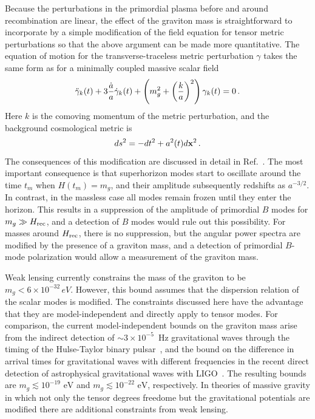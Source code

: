 Because the perturbations in the primordial plasma before and around recombination are linear, the effect of the graviton mass is straightforward to incorporate by a simple modification of the field equation for tensor metric perturbations so that the above argument can be made more quantitative. The equation of motion for the transverse-traceless metric perturbation $\gamma$ takes the same form as for a minimally coupled massive scalar field
\begin{equation}
\label{massive}
\ddot{\gamma}_k(t)+3{\dot a\over a} \dot{\gamma}_k(t)+\left(m_g^2+\left(\frac{k}{a}\right)^2\right) \gamma_k(t)=0\,.
\end{equation}
Here $k$ is the comoving momentum of the metric perturbation, and the background cosmological metric is
\begin{equation}
ds^2= -dt^2+a^2(t)d{\bf x}^2\,.
\end{equation}
The consequences of this modification are discussed in detail in Ref.~\cite{Dubovsky:2009xk}. The most important consequence is that superhorizon modes start to oscillate around the time $t_m$ when $H(t_m)=m_g$, and their amplitude subsequently redshifts as $a^{-3/2}$. In contrast, in the massless case all modes remain frozen until they enter the horizon. This results in a suppression of the amplitude of primordial $B$ modes for $m_g\gg H_{\rm rec}$, and a detection of $B$ modes would rule out this possibility. For masses around $H_{\rm rec}$, there is no suppression, but the angular power spectra are modified by the presence of a graviton mass, and a detection of primordial $B$-mode polarization would allow a measurement of the graviton mass. 
 
Weak lensing currently constrains the mass of the graviton to be $m_g<6\times 10^{-32}\,eV$. However, this bound assumes that the dispersion relation of the scalar modes is modified. The constraints discussed here have the advantage that they are model-independent and directly apply to tensor modes. For comparison, the current model-independent bounds on the graviton mass arise from the indirect detection of $\sim 3\times 10^{-5}$~Hz gravitational waves through the timing of the Hulse-Taylor binary pulsar~\cite{Finn:2001qi}, and the bound on the difference in arrival times for gravitational waves with different frequencies in the recent direct detection of astrophysical gravitational waves with LIGO~\cite{Abbott:2016blz}. The resulting bounds are $m_g\lesssim 10^{-19}{\mbox{ eV}}$ and $m_g\lesssim 10^{-22}{\mbox{ eV}}$, respectively. In theories of massive gravity in which not only the tensor degrees freedome but the gravitational potentials are modified there are additional constraints from weak lensing. 

